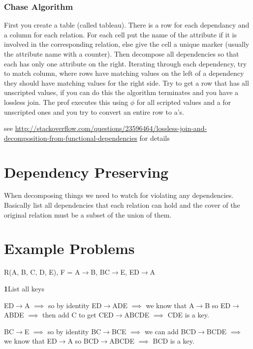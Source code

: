 \documentclass{article}
\begin{document}
\subsubsection*{Chase Algorithm} %
\label{ssub:chase_algorithm}
First you create a table (called tableau). There is a row for each dependancy and a column for each relation. For each cell put the name of the attribute if it is involved in the corresponding relation, else give the cell a unique marker (usually the attribute name with a counter). Then decompose all dependencies so that each has only one attribute on the right. Iterating through each dependency, try to match column, where rows have matching values on the left of a dependency they should have matching values for the right side. Try to get a row that has all unscripted values, if you can do this the algorithm terminates and you have a lossless join. The prof executes this using $\phi$ for all scripted values and a for unscripted ones and you try to convert an entire row to a's.

see \url{http://stackoverflow.com/questions/23596464/lossless-join-and-decomposition-from-functional-dependencies} for details

\section*{Dependency Preserving} %
\label{sec:dependency_preserving}
When decomposing things we need to watch for violating any dependencies. Basically list all dependencies that each relation can hold and the cover of the original relation must be a subset of the union of them.

\section*{Example Problems} %
\label{sec:example_problems}
R(A, B, C, D, E), F = {A$\rightarrow$B, BC$\rightarrow$E, ED$\rightarrow$A}

\textbf{1}List all keys

ED$\rightarrow$A $\implies$ so by identity ED$\rightarrow$ADE $\implies$ we know that A$\rightarrow$B so ED$\rightarrow$ABDE $\implies$ then add C to get CED$\rightarrow$ABCDE $\implies$ CDE is a key.

BC$\rightarrow$E $\implies$ so by identity BC$\rightarrow$BCE $\implies$ we can add BCD$\rightarrow$BCDE $\implies$ we know that ED$\rightarrow$A so BCD$\rightarrow$ABCDE $\implies$ BCD is a key.
\end{document}
